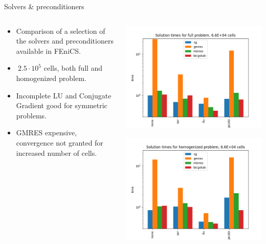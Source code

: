 \documentclass{beamer}
\begin{document}
\begin{frame}[t]{Solvers \& preconditioners}
  \begin{columns}
    \begin{column}[c]{.5\textwidth}
      \begin{itemize}
      \item Comparison of a selection of the solvers and preconditioners available in FEniCS.
      \item $~2.5\cdot10^{5}$ cells, both full and homogenized problem.
      \item Incomplete LU and Conjugate Gradient good for symmetric problems.
      \item GMRES expensive, convergence not granted for increased number of cells.
    \end{itemize}
  \end{column}
  \begin{column}[c]{.5\textwidth}

    \includegraphics[width=0.9\linewidth]{SolverTimesFullh8.png}

    \includegraphics[width=0.9\linewidth]{SolverTimesHomoh8.png}

 \end{column}
\end{columns}
\end{frame}
\end{document}
